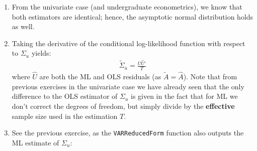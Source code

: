 \begin{enumerate}
\item From the univariate case (and undergraduate econometrics),
we know that both estimators are identical;
hence, the asymptotic normal distribution holds as well.

\item Taking the derivative of the conditional log-likelihood function with respect to \(\Sigma_u\) yields:
\begin{align*}
\widetilde{\Sigma}_u = \frac{\hat{U}\hat{U}'}{T}
\end{align*}
where \(\hat{U}\) are both the ML and OLS residuals (as \(\widetilde{A}=\widehat{A}\)).
Note that from previous exercises in the univariate case
we have already seen that the only difference to the OLS estimator of \(\Sigma_u\)
is given in the fact that for ML we don't correct the degrees of freedom,
but simply divide by the \textbf{effective} sample size used in the estimation \(T\).

\item See the previous exercise, as the \texttt{VARReducedForm} function also outputs the ML estimate of \(\Sigma_u\):


\end{enumerate}